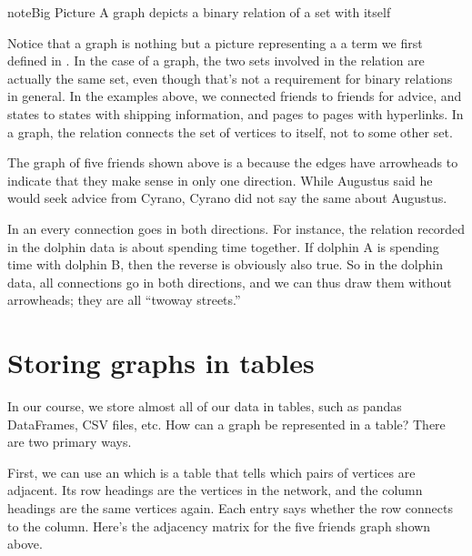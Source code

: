 \documentclass[letterpaper,10pt,english]{jupyterBook}
\begin{document}
\begin{sphinxadmonition}{note}{Big Picture \sphinxhyphen{} A graph depicts a binary relation of a set with itself}

\sphinxAtStartPar
Notice that a graph is nothing but a picture representing a  a term we first defined in {\hyperref[\detokenize{chapter-2-mathematical-foundations::doc}]{}}.  In the case of a graph, the two sets involved in the relation are actually the same set, even though that’s not a requirement for binary relations in general.  In the examples above, we connected friends to friends for advice, and states to states with shipping information, and pages to pages with hyperlinks.  In a graph, the relation connects the set of vertices to itself, not to some other set.
\end{sphinxadmonition}

\sphinxAtStartPar
The graph of five friends shown above is a  because the edges have arrowheads to indicate that they make sense in only one direction.  While Augustus said he would seek advice from Cyrano, Cyrano did not say the same about Augustus.

\sphinxAtStartPar
In an  every connection goes in both directions.  For instance, the relation recorded in the dolphin data is about spending time together.  If dolphin A is spending time with dolphin B, then the reverse is obviously also true.  So in the dolphin data, all connections go in both directions, and we can thus draw them without arrowheads; they are all “two\sphinxhyphen{}way streets.”


\section{Storing graphs in tables}
\label{\detokenize{chapter-15-networks:storing-graphs-in-tables}}
\sphinxAtStartPar
In our course, we store almost all of our data in tables, such as pandas DataFrames, CSV files, etc.  How can a graph be represented in a table?  There are two primary ways.

\sphinxAtStartPar
First, we can use an  which is a table that tells which pairs of vertices are adjacent.  Its row headings are the vertices in the network, and the column headings are the same vertices again.  Each entry says whether the row connects to the column.  Here’s the adjacency matrix for the five friends graph shown above.
\end{document}
